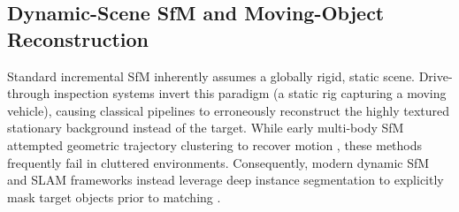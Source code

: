 \documentclass[letterpaper, 10 pt, conference]{ieeeconf}  %
\begin{document}










\subsection{Dynamic-Scene SfM and Moving-Object Reconstruction}
\label{subsec:related_work_dynamic_scene_sfm_and_moving_object_reconstruction}

Standard incremental SfM inherently assumes a globally rigid, static scene. Drive-through inspection systems invert this paradigm (a static rig capturing a moving vehicle), causing classical pipelines to erroneously reconstruct the highly textured stationary background instead of the target. While early multi-body SfM attempted geometric trajectory clustering to recover motion \cite{shakernia2003multibody}, these methods frequently fail in cluttered environments. Consequently, modern dynamic SfM and SLAM frameworks instead leverage deep instance segmentation \cite{kirillov2023segment} to explicitly mask target objects prior to matching \cite{bescos2018dynaslam}. 
\end{document}
